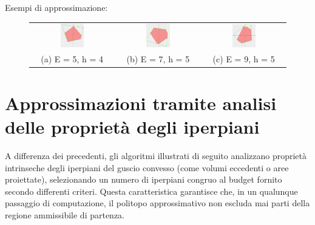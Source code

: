 \begin{center}
    Esempi di approssimazione:
\end{center}
\begin{figure}[H]
    \centering
    \begin{tabular}{ccc}
        \includegraphics[width=0.3\textwidth]{media/DistanceFromG/5_4.png} &
        \includegraphics[width=0.3\textwidth]{media/DistanceFromG/7_5.png} &
        \includegraphics[width=0.3\textwidth]{media/DistanceFromG/9_5.png} \\
        (a) E = 5, h = 4 & (b) E = 7, h = 5 & (c) E = 9, h = 5
    \end{tabular}
\end{figure}

\pagebreak
\section{Approssimazioni tramite analisi delle proprietà degli iperpiani}

A differenza dei precedenti, gli algoritmi illustrati di seguito analizzano proprietà
intrinseche degli iperpiani del guscio convesso (come volumi eccedenti o aree proiettate),
selezionando un numero di iperpiani congruo al budget fornito secondo differenti criteri.
Questa caratteristica garantisce che, in un qualunque passaggio di computazione, 
il politopo approssimativo non escluda mai parti della regione ammissibile di partenza.

